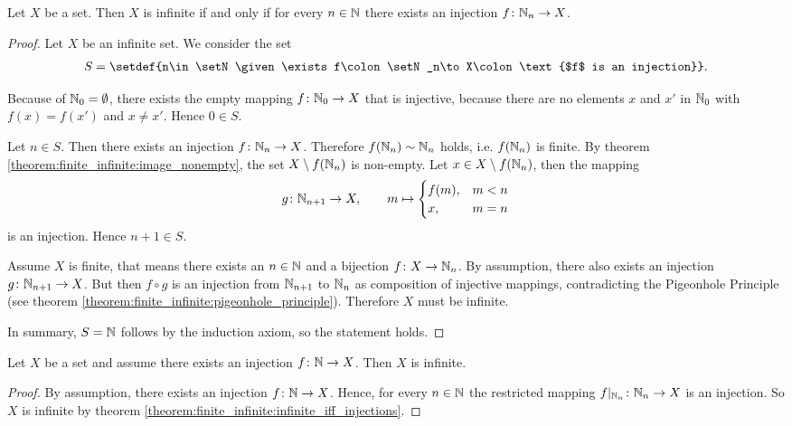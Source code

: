 \begin{theorem}\label{theorem:finite_infinite:infinite_iff_injections}
    Let $X$ be a set. Then $X$ is infinite if and only if for every $n\in\mathbb{N}$ there exists an injection $f\colon\mathbb{N}_n\to X$.
\end{theorem}
\begin{proof}
    \proofright Let $X$ be an infinite set. We consider the set
    \begin{align}S=\setdef{n\in\setN\given \exists f\colon\setN_n\to X\colon \text{$f$ is an injection}}.\end{align}
    
     Because of $\mathbb{N}_0=\emptyset$, there exists the empty mapping $f\colon\mathbb{N}_0\to X$ that is injective, because there are no elements $x$ and $x'$ in $\mathbb{N}_0$ with $f(x)=f(x')$ and $x\neq x'$. Hence $0\in S$.

     Let $n\in S$. Then there exists an injection $f\colon\mathbb{N}_n\to X$. Therefore $f(\mathbb{N}_n)\sim\mathbb{N}_n$ holds, i.e. $f(\mathbb{N}_n)$ is finite. By theorem \ref{theorem:finite_infinite:image_nonempty}, the set $X\setminus f(\mathbb{N}_n)$ is non-empty. Let $x\in X\setminus f(\mathbb{N}_n)$, then the mapping
    \begin{align}g\colon\mathbb{N}_{n+1}\to X,\qquad m\mapsto \begin{cases}f(m), & m<n \\ x, & m=n\end{cases}\end{align}
    is an injection. Hence $n+1\in S$.

    \proofleft Assume $X$ is finite, that means there exists an $n\in\mathbb{N}$ and a bijection $f\colon X\to\mathbb{N}_n$. By assumption, there also exists an injection $g\colon\mathbb{N}_{n+1}\to X$. But then $f\circ g$ is an injection from $\mathbb{N}_{n+1}$ to $\mathbb{N}_n$ as composition of injective mappings, contradicting the Pigeonhole Principle (see theorem \ref{theorem:finite_infinite:pigeonhole_principle}). Therefore $X$ must be infinite.
    
    In summary, $S=\mathbb{N}$ follows by the induction axiom, so the statement holds.
\end{proof}

\begin{theorem}\label{theorem:finite_infinite:injection_from_natural_numbers}
    Let $X$ be a set and assume there exists an injection $f\colon\mathbb{N}\to X$. Then $X$ is infinite.
\end{theorem}
\begin{proof}
    By assumption, there exists an injection $f\colon\mathbb{N}\to X$. Hence, for every $n\in\mathbb{N}$ the restricted mapping $f\vert_{\mathbb{N}_n}\colon\mathbb{N}_n\to X$ is an injection. So $X$ is infinite by theorem \ref{theorem:finite_infinite:infinite_iff_injections}.
\end{proof}

